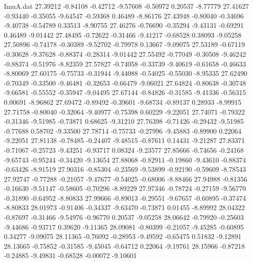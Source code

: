 \begin{filecontents}{ImuA.dat}
  27.39212   -0.84108   -0.42712   -9.57608   -0.50972    0.20537   -8.77779
  27.41627   -0.93440   -0.35055   -9.64547   -0.59368    0.46489   -8.86176
  27.43948   -0.80040   -0.34696   -9.40738   -0.54789    0.33513   -8.90755
  27.46276   -0.76690   -0.35294   -9.43131   -0.69291    0.46489   -9.01442
  27.48495   -0.72622   -0.31466   -9.41217   -0.68528    0.38093   -9.05258
  27.50896   -0.74178   -0.30389   -9.52702   -0.79978    0.13667   -9.09075
  27.53189   -0.67119   -0.30628   -9.37628   -0.88374   -0.28314   -9.01442
  27.55492   -0.77049   -0.30508   -9.46242   -0.88374   -0.51976   -8.82359
  27.57827   -0.74058   -0.33739   -9.40619   -0.61658   -0.46633   -8.80069
  27.60175   -0.75733   -0.31944   -9.44088   -0.54025   -0.55030   -8.95335
  27.62490   -0.70349   -0.33500   -9.46481   -0.32653   -0.66479   -9.06021
  27.64824   -0.80638   -0.30748   -9.66581   -0.55552   -0.35947   -9.04495
  27.67144   -0.84826   -0.31585   -9.41336   -0.56315    0.00691   -8.96862
  27.69472   -0.89492   -0.39601   -9.68734   -0.89137    0.28933   -8.99915
  27.71758   -0.80040   -0.32064   -9.40977   -0.75398    0.60229   -9.22051
  27.74071   -0.79322   -0.31346   -9.51985   -0.73871    0.68625   -9.31210
  27.76398   -0.71426   -0.29432   -9.51985   -0.77688    0.58702   -9.33500
  27.78714   -0.75733   -0.27996   -9.45883   -0.89900    0.22064   -9.22051
  27.81138   -0.78485   -0.24407   -9.48515   -0.87611    0.14431   -9.21287
  27.83371   -0.71067   -0.25723   -9.43251   -0.93717    0.08324   -9.23577
  27.85666   -0.74656   -0.24168   -9.65743   -0.95244   -0.34420   -9.13654
  27.88068   -0.82911   -0.19860   -9.43610   -0.88374   -0.63426   -8.91519
  27.90316   -0.85304   -0.23569   -9.53899   -0.92190   -0.59609   -8.78543
  27.92747   -0.77288   -0.21057   -9.47677   -0.54025   -0.68006   -8.88466
  27.94988   -0.81356   -0.16630   -9.51147   -0.58605   -0.70296   -8.89229
  27.97346   -0.78724   -0.27159   -9.56770   -0.31890   -0.64952   -8.80833
  27.99666   -0.89013   -0.29551   -9.67657   -0.60895   -0.37474   -8.80833
  28.01973   -0.91406   -0.34337   -9.63470   -0.73871    0.01455   -8.89992
  28.04322   -0.87697   -0.31466   -9.54976   -0.96770    0.20537   -9.05258
  28.06642   -0.79920   -0.25603   -9.44686   -0.93717    0.39620   -9.11365
  28.09081   -0.80399   -0.21057   -9.45285   -0.60895    0.34277   -9.09075
  28.11365   -0.76092   -0.28953   -9.49592   -0.65475    0.51832   -9.12891
  28.13665   -0.75852   -0.31585   -9.45045   -0.64712    0.22064   -9.19761
  28.15966   -0.87218   -0.24885   -9.49831   -0.68528   -0.00072   -9.10601

\end{filecontents}
